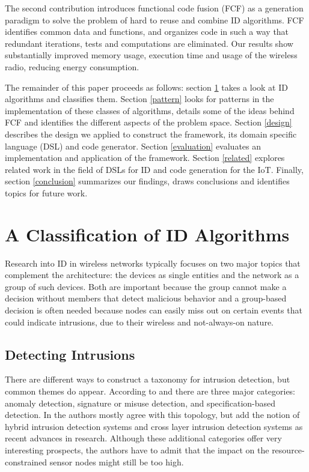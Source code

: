 \documentclass[conference]{IEEEtran}
\begin{document}

The second contribution introduces functional code fusion (FCF) as a generation
paradigm to solve the problem of hard to reuse and combine ID algorithms. FCF
identifies common data and functions, and organizes code in such a way that
redundant iterations, tests and computations are eliminated. Our results show
substantially improved memory usage, execution time and usage of the wireless
radio, reducing energy consumption.


The remainder of this paper proceeds as follows: section \ref{classification}
takes a look at ID algorithms and classifies them. Section \ref{pattern} looks
for patterns in the implementation of these classes of algorithms, details some
of the ideas behind FCF and identifies the different aspects of the problem
space. Section \ref{design} describes the design we applied to construct the
framework, its domain specific language (DSL) and code generator. Section
\ref{evaluation} evaluates an implementation and application of the framework.
Section \ref{related} explores related work in the field of DSLs for ID and
code generation for the IoT. Finally, section \ref{conclusion} summarizes our
findings, draws conclusions and identifies topics for future work.

\section{A Classification of ID Algorithms}
\label{classification}

Research into ID in wireless networks typically focuses on two major topics
that complement the architecture: the devices as single entities and the
network as a group of such devices. Both are important because the group cannot
make a decision without members that detect malicious behavior and a
group-based decision is often needed because nodes can easily miss out on
certain events that could indicate intrusions, due to their wireless and
not-always-on nature.

\subsection{Detecting Intrusions}
\label{detection}

There are different ways to construct a taxonomy for intrusion detection, but
common themes do appear. According to \cite{mishra2004intrusion} and
\cite{ioannis2007towards} there are three major categories: anomaly detection,
signature or misuse detection, and specification-based detection. In
\cite{alrajeh2013intrusion} the authors mostly agree with this topology, but
add the notion of hybrid intrusion detection systems and cross layer intrusion
detection systems as recent advances in research. Although these additional
categories offer very interesting prospects, the authors have to admit that the
impact on the resource-constrained sensor nodes might still be too high.
\end{document}

